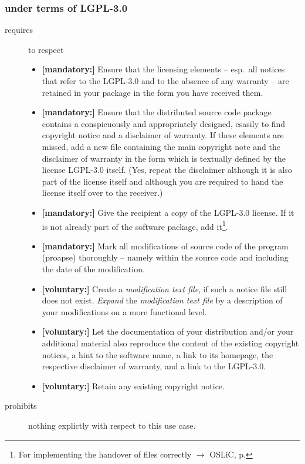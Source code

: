 \subsubsection{under terms of LGPL-3.0}

\begin{description}
\item[requires] to respect
\begin{itemize}
  
  \item \textbf{[mandatory:]} Ensure that the licensing elements -- esp.\ all
  notices that refer to the LGPL-3.0 and to the absence of any
  warranty -- are retained in your package in the form you have received them.

  \item \textbf{[mandatory:]} Ensure that the distributed source code package
  contains a conspicuously and appropriately designed, esasily to find copyright
  notice and a disclaimer of warranty. If these elements are missed, add a new
  file containing the main copyright note and the disclaimer of warranty in the
  form which is textually defined by the license LGPL-3.0 itself. (Yes, repeat
  the disclaimer although it is also part of the license itself and although you
  are required to hand the license itself over to the receiver.)
  
  \item \textbf{[mandatory:]} Give the recipient a copy of the LGPL-3.0 license.
  If it is not already part of the software package, add it\footnote{For
  implementing the handover of files correctly $\rightarrow$ OSLiC, p.
  \pageref{DistributingFilesHint}}.

  \item \textbf{[mandatory:]} Mark all modifications of source code of the
  program (proapse) thoroughly -- namely within the source code and including
  the date of the modification.
  
  \item \textbf{[voluntary:]} Create a \emph{modification text file}, if such a
  notice file still does not exist. \emph{Expand} the \emph{modification text
  file} by a description of your modifications on a more functional level.
    
  \item \textbf{[voluntary:]} Let the documentation of your distribution and/or
  your additional material also reproduce the content of the existing
  copyright notices, a hint to the software name, a link to its homepage,
  the respective disclaimer of warranty, and a link to the LGPL-3.0.
  
  \item \textbf{[voluntary:]} Retain any existing copyright notice.  
  
 \end{itemize}
 
\item[prohibits] nothing explictly with respect to this use case.

\end{description}

